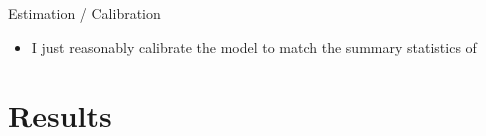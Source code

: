 \documentclass[aspectratio=169]{beamer}
\begin{document}
\begin{frame}{Estimation / Calibration}\label{estimation_result}
	\begin{itemize}\footnotesize
		\item I just reasonably calibrate the model to match the summary statistics of \cite{martinsson2024effect}
	\end{itemize}
	\begin{table}[http]
		\resizebox{0.3\textwidth}{!}{}
	\end{table}
		{
		\hfill
		\hyperlink{sensitivity}{}}
\end{frame}





\section{Results}
\end{document}
